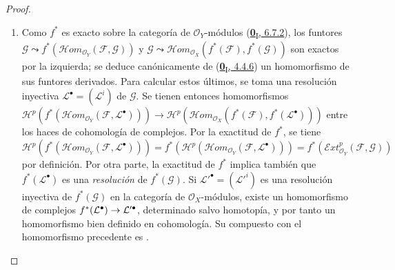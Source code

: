 \documentclass[10pt,oneside,openany]{book}
\theoremstyle{egaenv}\newtheorem*{env}{---}
\theoremstyle{egastatement}
\theoremstyle{egadescription}
\renewcommand{\to}{\mathchoice{\longrightarrow}{\rightarrow}{\rightarrow}{\rightarrow}}
\begin{document}
\begin{proof}
\begin{enumerate}
  \item[\rm(i)]
  Como $f^*$ es exacto sobre la categoría de $\mathcal O_Y$-módulos (\hyperref[0.6.7.2-fr]{\textbf{0}\textsubscript{I}, 6.7.2}), los funtores $\mathcal G\leadsto f^*(\mathcal{H}om_{\mathcal O_Y}(\mathcal F,\mathcal G))$ y $\mathcal G\leadsto\mathcal{H}om_{\mathcal O_X}(f^*(\mathcal F),f^*(\mathcal G))$ son exactos por la izquierda; se deduce canónicamente de (\hyperref[0.4.4.6-fr]{\textbf{0}\textsubscript{I}, 4.4.6}) un homomorfismo de sus funtores derivados. Para calcular estos últimos, se toma una resolución inyectiva $\mathcal L^\bullet=(\mathcal L^i)$ de $\mathcal G$.  Se tienen entonces
  homomorfismos
  $\mathcal H^p(f^*(\mathcal{H}om_{\mathcal O_Y}(\mathcal F,\mathcal L^\bullet)))\longrightarrow\mathcal H^p(\mathcal{H}om_{\mathcal O_X}(f^*(\mathcal F),f^*(\mathcal L^\bullet)))$
  entre los haces de cohomología de complejos.
  Por la exactitud de $f^*$, se tiene $\mathcal H^p(f^*(\mathcal{H}om_{\mathcal O_Y}(\mathcal F,\mathcal L^\bullet)))=f^*(\mathcal H^p(\mathcal{H}om_{\mathcal O_Y}(\mathcal F,\mathcal L^\bullet)))=f^*(\mathcal{E}xt_{\mathcal O_Y}^p(\mathcal F,\mathcal G))$ por definición. Por otra parte, la exactitud de $f^*$ implica también que
  $f^*(\mathcal L^\bullet)$ es una \emph{resolución} de $f^*(\mathcal G)$.
  Si $\mathcal L'^\bullet=(\mathcal L'^{i})$ es una resolución inyectiva
  de $f^*(\mathcal G)$ en la categoría de $\mathcal O_X$-módulos, existe un
  homomorfismo de complejos
  $f^*(\mathcal L^\bullet)\to\mathcal L'^\bullet$,
  determinado salvo homotopía, y por tanto un homomorfismo bien definido en
  cohomología.  Su compuesto con el homomorfismo precedente es
  .


\end{enumerate}
\end{proof}
\end{document}
